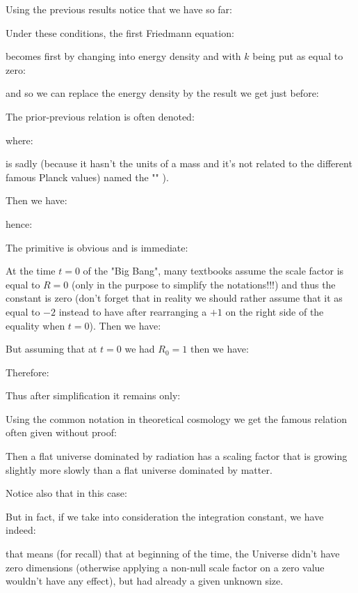 	\begin{tcolorbox}[title=Remark,colframe=black,arc=10pt]
	Using the previous results notice that we have so far:
	
	\end{tcolorbox}
	
	Under these conditions, the first Friedmann equation:
	
	becomes first by changing into energy density and with $k$ being put as equal to zero:
	
	and so we can replace the energy density by the result we get just before:
	
	\begin{tcolorbox}[title=Remark,colframe=black,arc=10pt]
	The prior-previous relation is often denoted:
	
	where:
	
	is sadly (because it hasn't the units of a mass and it's not related to the different famous Planck values) named the "" ).
	\end{tcolorbox}
	Then we have:
	
	hence:
	
	The primitive is obvious and is immediate:
	
	At the time $t=0$ of the "Big Bang", many textbooks assume the scale factor is equal to $R=0$ (only in the purpose to simplify the notations!!!) and thus the constant is zero (don't forget that in reality we should rather assume that it as equal to $-2$ instead to have after rearranging a $+1$ on the right side of the equality when $t=0$). Then we have:
	
	But assuming that at $t=0$ we had $R_0=1$ then we have:
	
	Therefore:
	
	Thus after simplification it remains only:
	
	Using the common notation in theoretical cosmology we get the famous relation often given without proof:
	
	Then a flat universe dominated by radiation has a scaling factor that is growing slightly more slowly than a flat universe dominated by matter.

	Notice also that in this case:
	
	But in fact, if we take into consideration the integration constant, we have indeed:
	
	that means (for recall) that at beginning of the time, the Universe didn't have zero dimensions (otherwise applying a non-null scale factor on a zero value wouldn't have any effect), but had already a given unknown size.
	
